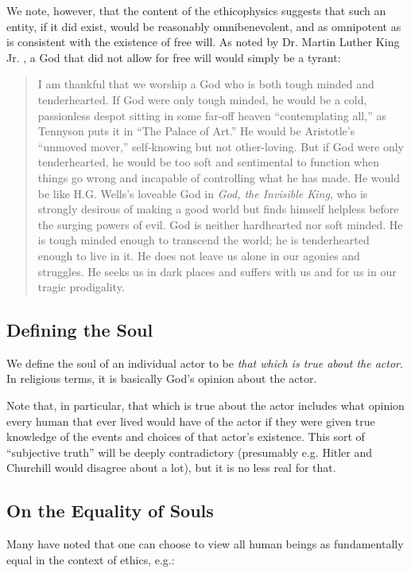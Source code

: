 \documentclass{article}
\begin{document}
We note, however, that the content of the ethicophysics suggests that
such an entity, if it did exist, would be reasonably omnibenevolent,
and as omnipotent as is consistent with the existence of free will.
As noted by Dr. Martin Luther King Jr. \cite{king1963tough}, a God that
did not allow for free will would simply be a tyrant:
\begin{quote}
  I am thankful that we worship a God who is both tough minded and
  tenderhearted. If God were only tough minded, he would be a cold,
  passionless despot sitting in some far-off heaven ``contemplating
  all,'' as Tennyson puts it in ``The Palace of Art.'' He would be
  Aristotle's ``unmoved mover,'' self-knowing but not other-loving.
  But if God were only tenderhearted, he would be too soft and
  sentimental to function when things go wrong and incapable of
  controlling what he has made. He would be like H.G. Wells's loveable
  God in {\em God, the Invisible King}, who is strongly desirous of
  making a good world but finds himself helpless before the surging
  powers of evil. God is neither hardhearted nor soft minded. He is
  tough minded enough to transcend the world; he is tenderhearted
  enough to live in it. He does not leave us alone in our agonies and
  struggles. He seeks us in dark places and suffers with us and for us
  in our tragic prodigality.
\end{quote}

\subsection{Defining the Soul}

We define the soul of an individual actor to be {\em that which is
  true about the actor}. In religious terms, it is basically God's
opinion about the actor.

Note that, in particular, that which is true about the actor includes
what opinion every human that ever lived would have of the actor if
they were given true knowledge of the events and choices of that
actor's existence. This sort of ``subjective truth'' will be deeply
contradictory (presumably e.g. Hitler and Churchill would disagree
about a lot), but it is no less real for that.

\subsection{On the Equality of Souls}

Many have noted that one can choose to view all human beings as
fundamentally equal in the context of ethics, e.g.:
\end{document}
